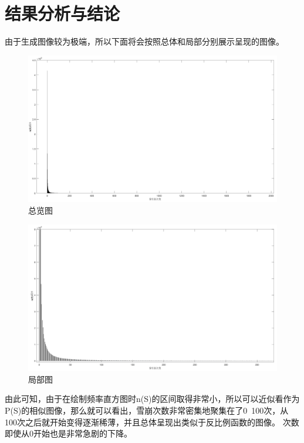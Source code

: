 \documentclass[UTF8,a4paper,10pt]{ctexart}
\begin{document}
\section{结果分析与结论}
由于生成图像较为极端，所以下面将会按照总体和局部分别展示呈现的图像。
	\begin{figure}[!htbp]
		\centering
		\includegraphics[width=1\textwidth,height=0.75\textwidth]{pictures/all.png}
		\caption{总览图} \label{all}
	\end{figure}
  \begin{figure}[!htbp]
		\centering
		\includegraphics[width=1\textwidth,height=0.75\textwidth]{pictures/part.png}
		\caption{局部图} \label{part}
	\end{figure}
\newpage
由此可知，由于在绘制频率直方图时n(S)的区间取得非常小，所以可以近似看作为P(S)的相似图像，那么就可以看出，雪崩次数非常密集地聚集在了0~100次，从100次之后就开始变得逐渐稀薄，并且总体呈现出类似于反比例函数的图像。\newline
次数即使从0开始也是非常急剧的下降。
\end{document}
